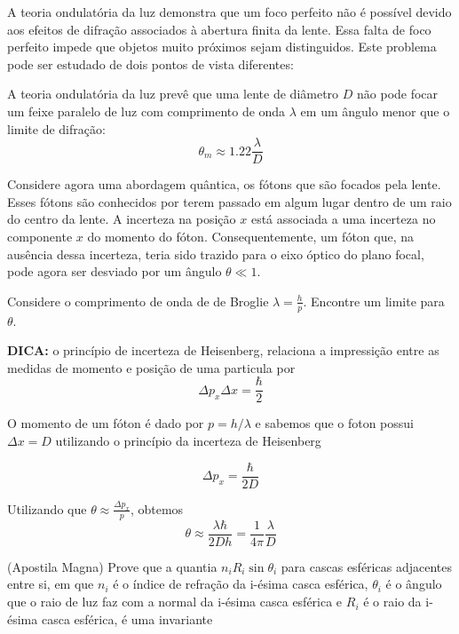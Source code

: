 \documentclass[11pt]{article}
\begin{document}
\begin{pproblem}
    A teoria ondulatória da luz demonstra que um foco perfeito não é possível devido aos efeitos de difração associados à abertura finita da lente. Essa falta de foco perfeito impede que objetos muito próximos sejam distinguidos. Este problema pode ser estudado de dois pontos de vista diferentes:

    A teoria ondulatória da luz prevê que uma lente de diâmetro $D$ não pode focar um feixe paralelo de luz com comprimento de onda $\lambda$ em um ângulo menor que o limite de difração:
    \begin{equation}
        \theta_m \approx 1.22 \frac{\lambda}{D}
    \end{equation}

    Considere agora uma abordagem quântica, os fótons que são focados pela lente. Esses fótons são conhecidos por terem passado em algum lugar dentro de um raio do centro da lente. A incerteza na posição $x$ está associada a uma incerteza no componente $x$ do momento do fóton. Consequentemente, um fóton que, na ausência dessa incerteza, teria sido trazido para o eixo óptico do plano focal, pode agora ser desviado por um ângulo $\theta \ll 1$.

    Considere o comprimento de onda de de Broglie $\lambda = \frac{h}{p}$. Encontre um limite para $\theta$.

    \textbf{DICA:} o princípio de incerteza de Heisenberg, relaciona a impressição entre as medidas de momento e posição de uma particula por 
    \[\Delta p_x \Delta x = \frac{\hbar}{2}\]

\begin{pssolution*}{}{}
    O momento de um fóton é dado por \(p = h/\lambda\) e sabemos que o foton possui \(\Delta x = D\) utilizando o princípio da incerteza de Heisenberg

    \[\Delta p_x = \frac{\hbar}{2D}\]

    Utilizando que \(\theta \approx \frac{\Delta p_x}{p}\), obtemos
    \[\boxed{\theta \approx\frac{\lambda\hbar}{2D h} = \frac{1}{4\pi}\frac{\lambda}{D}}\]
\end{pssolution*}
\end{pproblem}

\begin{pproblem} (Apostila Magna)
    Prove que a quantia \(n_iR_i\sin \theta_i\) para cascas esféricas adjacentes entre si, em que \(n_i\) é o índice de refração da i-ésima casca esférica, \(\theta_i\) é o ângulo que o raio de luz faz com a normal da i-ésima casca esférica e \(R_i\) é o raio da i-ésima casca esférica, é uma invariante
    
\end{pproblem}
\end{document}
